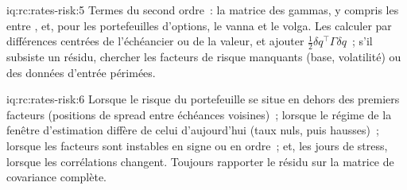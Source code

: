 \begin{solution}{iq:rc:rates-risk:5}
Termes du second ordre~: la matrice des gammas, y compris les  entre ,
et, pour les portefeuilles d'options, le vanna et le volga. Les calculer par différences centrées de
l'échéancier ou de la valeur, et ajouter $\tfrac12\delta q^\top\Gamma\delta q$~; s'il subsiste un
résidu, chercher les facteurs de risque manquants (base, volatilité) ou des
données d'entrée périmées.
\end{solution}

\begin{solution}{iq:rc:rates-risk:6}
Lorsque le risque du portefeuille se situe en dehors des premiers facteurs (positions de spread entre
échéances voisines)~; lorsque le régime de la fenêtre d'estimation diffère de celui d'aujourd'hui
(taux nuls, puis hausses)~; lorsque les facteurs sont instables en signe ou en
ordre~; et, les jours de stress, lorsque les corrélations changent. Toujours rapporter le résidu
sur la matrice de covariance complète.
\end{solution}
